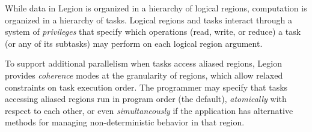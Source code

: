 While data in Legion is organized in a hierarchy of logical regions,
computation is organized in a hierarchy of tasks.  Logical regions and tasks interact
through a system of {\em privileges} that specify which operations (read, write, or reduce)
a task (or any of its subtasks) may perform on each logical region argument.  


To support additional parallelism when tasks access aliased regions,
Legion provides {\em coherence} modes at the granularity of regions, 
which allow relaxed constraints on task execution order.  The programmer may
specify that tasks accessing aliased regions run in
program order (the default), {\em atomically} with respect to each
other, or even {\em simultaneously} if the application has alternative
methods for managing non-deterministic
behavior in that region.

